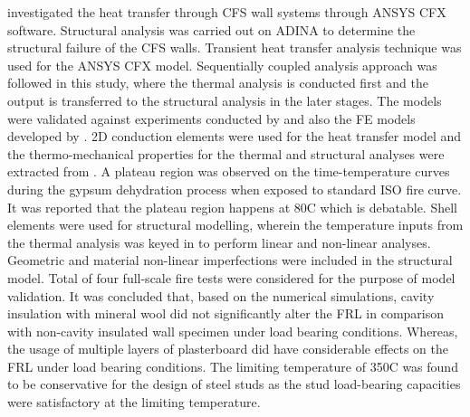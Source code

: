 \citet{Thanasoulas2016} investigated the heat transfer through CFS wall systems through ANSYS CFX software. Structural analysis was carried out on ADINA to determine the structural failure of the CFS walls. Transient heat transfer analysis technique was used for the ANSYS CFX model. Sequentially coupled analysis approach was followed in this study, where the thermal analysis is conducted first and the output is transferred to the structural analysis in the later stages. The models were validated against experiments conducted by \citet{Gunalan2013e} and also the FE models developed by \citet{Gunalan2013f}. 2D conduction elements were used for the heat transfer model and the thermo-mechanical properties for the thermal and structural analyses were extracted from \citet{GhaziWakili2007,Kolaitis2013}. A plateau region was observed on the time-temperature curves during the gypsum dehydration process when exposed to standard ISO fire curve. It was reported that the plateau region happens at 80\degree C which is debatable. Shell elements were used for structural modelling, wherein the temperature inputs from the thermal analysis was keyed in to perform linear and non-linear analyses. Geometric and material non-linear imperfections were included in the structural model. Total of four full-scale fire tests were considered for the purpose of model validation. It was concluded that, based on the numerical simulations, cavity insulation with mineral wool did not significantly alter the FRL in comparison with non-cavity insulated wall specimen under load bearing conditions. Whereas, the usage of multiple layers of plasterboard did have considerable effects on the FRL under load bearing conditions. The limiting temperature of 350\degree C was found to be conservative for the design of steel studs as the stud load-bearing capacities were satisfactory at the limiting temperature.      

